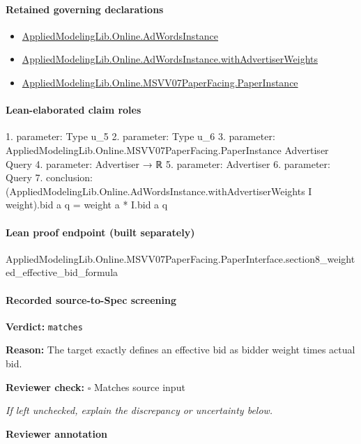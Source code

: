 \documentclass[10pt]{article}
\newcommand{\reviewerbox}{%
  \par\noindent\fbox{\parbox{0.96\linewidth}{\rule{0pt}{0.38in}}}\par
}
\newcommand{\reviewmatch}[1]{%
  \par\noindent\textbf{Reviewer check:} $\square$\; #1\par
  \noindent\emph{If left unchecked, explain the discrepancy or uncertainty below.}\par
}
\begin{document}
\paragraph{Retained governing declarations}
\begin{itemize}\raggedright
\item \hyperlink{governing-declaration-e5ce49672bf26ab1}{Applied\allowbreak{}Modeling\allowbreak{}Lib.\allowbreak{}Online.\allowbreak{}Ad\allowbreak{}Words\allowbreak{}Instance}
\item \hyperlink{governing-declaration-7d36ab6193f4d84f}{Applied\allowbreak{}Modeling\allowbreak{}Lib.\allowbreak{}Online.\allowbreak{}Ad\allowbreak{}Words\allowbreak{}Instance.\allowbreak{}with\allowbreak{}Advertiser\allowbreak{}Weights}
\item \hyperlink{governing-declaration-11907576ec71eeb5}{Applied\allowbreak{}Modeling\allowbreak{}Lib.\allowbreak{}Online.\allowbreak{}MSVV07\allowbreak{}Paper\allowbreak{}Facing.\allowbreak{}Paper\allowbreak{}Instance}
\end{itemize}
\paragraph{Lean-elaborated claim roles}\begin{ReviewVerbatim}
1. parameter: Type u_5
2. parameter: Type u_6
3. parameter: AppliedModelingLib.Online.MSVV07PaperFacing.PaperInstance Advertiser Query
4. parameter: Advertiser → ℝ
5. parameter: Advertiser
6. parameter: Query
7. conclusion: (AppliedModelingLib.Online.AdWordsInstance.withAdvertiserWeights I weight).bid a q = weight a * I.bid a q
\end{ReviewVerbatim}

\paragraph{Lean proof endpoint (built separately)}\begin{ReviewVerbatim}
AppliedModelingLib.Online.MSVV07PaperFacing.PaperInterface.section8_weighted_effective_bid_formula
\end{ReviewVerbatim}

\paragraph{Recorded source-to-Spec screening}
\textbf{Verdict:} \texttt{matches}
\\
{\raggedright
\textbf{Reason:} The target exactly defines an effective bid as bidder weight times actual bid.\allowbreak{}
\par}
\reviewmatch{Matches source input}
\noindent\textbf{Reviewer annotation}\par
\reviewerbox
\clearpage
\hypertarget{source-claim-2e933b89c9d18667}{}
\end{document}
